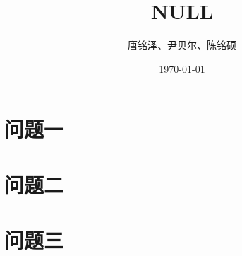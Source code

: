 \documentclass[UTF8]{ctexart}
\title{NULL}
\author{唐铭泽、尹贝尔、陈铭硕}
\date{\today}
\begin{document}
\section{问题一}
\section{问题二}
\section{问题三}
\maketitle
\end{document}
